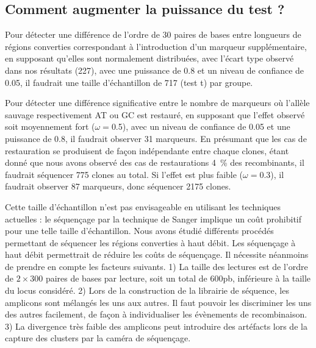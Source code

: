 \subsection{Comment augmenter la puissance du test ?}
\label{subsec:discu-puissance}

Pour détecter une différence de l'ordre de \num{30} paires de bases entre
longueurs de régions converties correspondant à l'introduction d'un marqueur
supplémentaire, en supposant qu'elles sont normalement distribuées, avec l'écart
type observé dans nos résultats (\num{227}), avec une puissance de \num{0.8} et
un niveau de confiance de \num{0.05}, il faudrait une taille d'échantillon de
\num{717} (test \textrm{t}) par groupe.

Pour détecter une différence significative entre le nombre de marqueurs où
l'allèle sauvage respectivement AT ou GC est restauré, en supposant que l'effet
observé soit moyennement fort ($\omega = $\num{0.5}), avec un niveau de
confiance de \num{0.05} et une puissance de \num{0.8}, il faudrait observer
\num{31} marqueurs. En présumant que les cas de restauration se produisent de
façon indépendante entre chaque clones, étant donné que nous avons observé des
cas de restaurations \SI{4}{\percent} des recombinants, il faudrait séquencer
\num{775} clones au total. Si l'effet est plus faible ($\omega = $\num{0.3}), il
faudrait observer \num{87} marqueurs, donc séquencer \num{2175} clones.

Cette taille d'échantillon n'est pas envisageable en utilisant les techniques
actuelles : le séquençage par la technique de Sanger implique un coût prohibitif
pour une telle taille d'échantillon. Nous avons étudié différents procédés
permettant de séquencer les régions converties à haut débit. Les séquençage à
haut débit permettrait de réduire les coûts de séquençage. Il nécessite
néanmoins de prendre en compte les facteurs suivants. 1) La taille des lectures
est de l'ordre de \(2 \times 300\) paires de bases par lecture, soit un total de
\(600\)pb, inférieure à la taille du locus considéré. 2) Lors de la
construction de la librairie de séquence, les amplicons sont mélangés les uns
aux autres. Il faut pouvoir les discriminer les uns des autres facilement, de
façon à individualiser les évènements de recombinaison. 3) La divergence très
faible des amplicons peut introduire des artéfacts lors de la capture des
clusters par la caméra de séquençage.


\afterpage{\blankpage}
